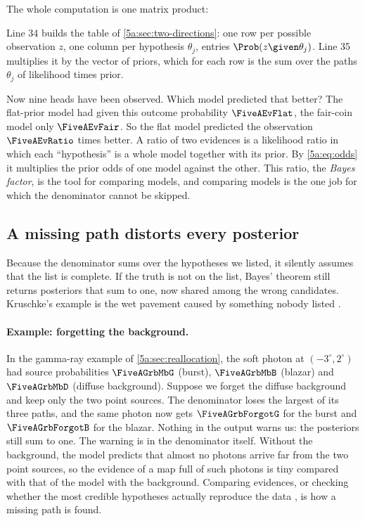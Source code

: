 The whole computation is one matrix product:


Line 34 builds the table of \cref{5a:sec:two-directions}: one row per possible
observation $z$, one column per hypothesis $\theta_j$, entries $\Prob(z\given\theta_j)$.
Line 35 multiplies it by the vector of priors, which for each row is the sum over the
paths $\theta_j$ of likelihood times prior.

Now nine heads have been observed. Which model predicted that better? The
flat-prior model had given this outcome probability $\FiveAEvFlat$, the fair-coin
model only $\FiveAEvFair$. So the flat model predicted the observation
$\FiveAEvRatio$ times better. A ratio of two evidences is a likelihood ratio in which
each ``hypothesis'' is a whole model together with its prior. By \eqref{5a:eq:odds}
it multiplies the prior odds of one model against the other. This ratio, the
\emph{Bayes factor}, is the tool for comparing models, and comparing models is the
one job for which the denominator cannot be skipped.

\subsection{A missing path distorts every posterior}

Because the denominator sums over the hypotheses we listed, it silently assumes that
the list is complete. If the truth is not on the list, Bayes' theorem still returns
posteriors that sum to one, now shared among the wrong candidates. Kruschke's example
is the wet pavement caused by something nobody listed .

\paragraph{Example: forgetting the background.}
In the gamma-ray example of \cref{5a:sec:reallocation}, the soft photon at
$(-3^\circ,2^\circ)$ had source probabilities $\FiveAGrbMbG$ (burst), $\FiveAGrbMbB$
(blazar) and $\FiveAGrbMbD$ (diffuse background). Suppose we forget the diffuse
background and keep only the two point sources. The denominator loses the largest of
its three paths, and the same photon now gets $\FiveAGrbForgotG$ for the burst and
$\FiveAGrbForgotB$ for the blazar. Nothing in the output warns us: the posteriors still
sum to one. The warning is in the denominator itself. Without the background, the model
predicts that almost no photons arrive far from the two point sources, so the evidence
of a map full of such photons is tiny compared with that of the model with the
background. Comparing evidences, or checking whether the most credible hypotheses
actually reproduce the data , is how a missing path is found.

